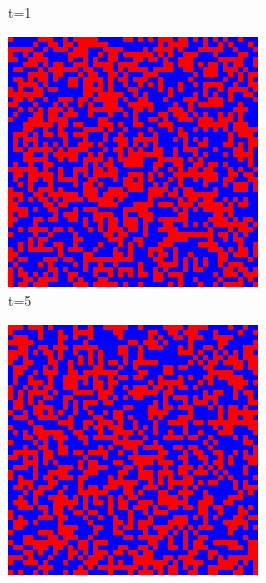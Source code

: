 \documentclass[a4paper, 11pt]{article}
\begin{document}
\begin{figure}[H]
\begin{subfigure}{.25\textwidth}
  \caption{t=1}
\end{subfigure}%
\begin{subfigure}{.25\textwidth}
  \centering
  \includegraphics[width=0.9\linewidth]{SNOWDRIFT_MOORE_50x50_t05}
  \caption{t=5}
\end{subfigure}%
\begin{subfigure}{.25\textwidth}
  \centering
  \includegraphics[width=0.9\linewidth]{SNOWDRIFT_MOORE_50x50_t10}

\end{subfigure}
\end{figure}
\end{document}
